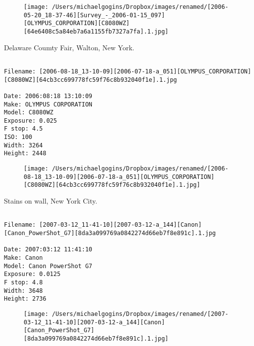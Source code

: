 \documentclass[11pt,letter,DIV=14,paper=landscape]{scrbook}
\begin{document}
\begin{figure}
\texttt{[image: /Users/michaelgogins/Dropbox/images/renamed/[2006-05-20\_18-37-46][Survey\_-\_2006-01-15\_097][OLYMPUS\_CORPORATION][C8080WZ][64e6408c5a84eb7a6a1155fb7327a7fa].1.jpg]}
\end{figure}
    
\clearpage
\noindent Delaware Coumty Fair, Walton, New York.
\noindent
\begin{lstlisting}

Filename: [2006-08-18_13-10-09][2006-07-18-a_051][OLYMPUS_CORPORATION][C8080WZ][64cb3cc699778fc59f76c8b932040f1e].1.jpg

Date: 2006:08:18 13:10:09
Make: OLYMPUS CORPORATION
Model: C8080WZ
Exposure: 0.025
F stop: 4.5
ISO: 100
Width: 3264
Height: 2448
\end{lstlisting}
\clearpage

\begin{figure}
\texttt{[image: /Users/michaelgogins/Dropbox/images/renamed/[2006-08-18\_13-10-09][2006-07-18-a\_051][OLYMPUS\_CORPORATION][C8080WZ][64cb3cc699778fc59f76c8b932040f1e].1.jpg]}
\end{figure}
    
\clearpage
\noindent Stains on wall, New York City.
\noindent
\begin{lstlisting}

Filename: [2007-03-12_11-41-10][2007-03-12-a_144][Canon][Canon_PowerShot_G7][8da3a099769a0842274d66eb7f8e891c].1.jpg

Date: 2007:03:12 11:41:10
Make: Canon
Model: Canon PowerShot G7
Exposure: 0.0125
F stop: 4.8
Width: 3648
Height: 2736
\end{lstlisting}
\clearpage

\begin{figure}
\texttt{[image: /Users/michaelgogins/Dropbox/images/renamed/[2007-03-12\_11-41-10][2007-03-12-a\_144][Canon][Canon\_PowerShot\_G7][8da3a099769a0842274d66eb7f8e891c].1.jpg]}
\end{figure}
    
\end{document}
